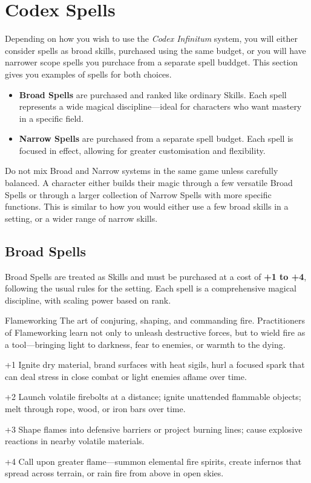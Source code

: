 \section{Codex Spells}

Depending on how you wish to use the \emph{Codex Infinitum} system, you will either consider spells as broad skills, purchased using the same budget, or you will have narrower scope spells you purchace from a separate spell buddget. This section gives you examples of spells for both choices.


\begin{itemize}
    \item \textbf{Broad Spells} are purchased and ranked like ordinary Skills. Each spell represents a wide magical discipline—ideal for characters who want mastery in a specific field.
    \item \textbf{Narrow Spells} are purchased from a separate spell budget. Each spell is focused in effect, allowing for greater customisation and flexibility.
\end{itemize}

Do not mix Broad and Narrow systems in the same game unless carefully balanced. A character either builds their magic through a few versatile Broad Spells or through a larger collection of Narrow Spells with more specific functions. This is similar to how you would either use a few broad skills in a setting, or a wider range of narrow skills.

\subsection{Broad Spells}

Broad Spells are treated as Skills and must be purchased at a cost of \textbf{+1 to +4}, following the usual rules for the setting. Each spell is a comprehensive magical discipline, with scaling power based on rank.

\begin{WyrdSpell}[Elemental]{Flameworking}
    The art of conjuring, shaping, and commanding fire. Practitioners of Flameworking learn not only to unleash destructive forces, but to wield fire as a tool—bringing light to darkness, fear to enemies, or warmth to the dying.

    \begin{WyrdSpellBlock}
        \item[+1] Ignite dry material, brand surfaces with heat sigils, hurl a focused spark that can deal stress in close combat or light enemies aflame over time.
        \item[+2] Launch volatile firebolts at a distance; ignite unattended flammable objects; melt through rope, wood, or iron bars over time.
        \item[+3] Shape flames into defensive barriers or project burning lines; cause explosive reactions in nearby volatile materials.
        \item[+4] Call upon greater flame—summon elemental fire spirits, create infernos that spread across terrain, or rain fire from above in open skies.
    \end{WyrdSpellBlock}
\end{WyrdSpell}

